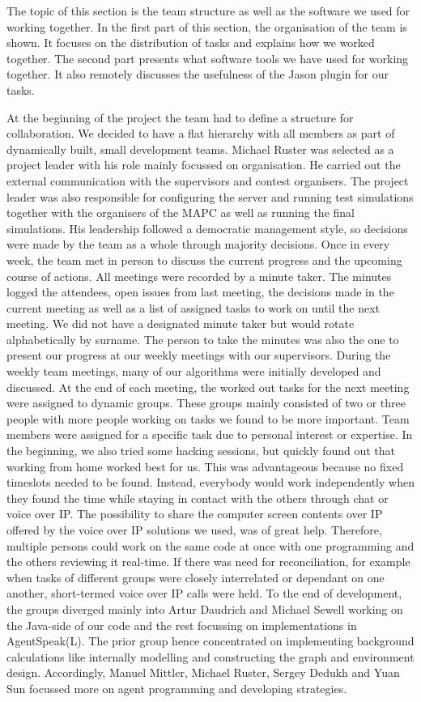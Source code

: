 The topic of this section is the team structure as well as the software we used for working together.
In the first part of this section, the organisation of the team is shown.
It focuses on the distribution of tasks and explains how we worked together.
The second part presents what software tools we have used for working together.
It also remotely discusses the usefulness of the Jason plugin for our tasks.

At the beginning of the project the team had to define a structure for collaboration.
We decided to have a flat hierarchy with all members as part of dynamically built, small development teams.
Michael Ruster was selected as a project leader with his role mainly focussed on organisation.
He carried out the external communication with the supervisors and contest organisers.
The project leader was also responsible for configuring the server and running test simulations together with the organisers of the MAPC as well as running the final simulations.
His leadership followed a democratic management style, so decisions were made by the team as a whole through majority decisions.
Once in every week, the team met in person to discuss the current progress and the upcoming course of actions.
All meetings were recorded by a minute taker.
The minutes logged the attendees, open issues from last meeting, the decisions made in the current meeting as well as a list of assigned tasks to work on until the next meeting.
We did not have a designated minute taker but would rotate alphabetically by surname.
The person to take the minutes was also the one to present our progress at our weekly meetings with our supervisors.
During the weekly team meetings, many of our algorithms were initially developed and discussed.
At the end of each meeting, the worked out tasks for the next meeting were assigned to dynamic groups.
These groups mainly consisted of two or three people with more people working on tasks we found to be more important.
Team members were assigned for a specific task due to personal interest or expertise.
In the beginning, we also tried some hacking sessions, but quickly found out that working from home worked best for us.
This was advantageous because no fixed timeslots needed to be found.
Instead, everybody would work independently when they found the time while staying in contact with the others through chat or voice over IP.
The possibility to share the computer screen contents over IP offered by the voice over IP solutions we used, was of great help.
Therefore, multiple persons could work on the same code at once with one programming and the others reviewing it real-time.
If there was need for reconciliation, for example when tasks of different groups were closely interrelated or dependant on one another, short-termed voice over IP calls were held.
To the end of development, the groups diverged mainly into Artur Daudrich and Michael Sewell working on the Java-side of our code and the rest focussing on implementations in AgentSpeak(L).
The prior group hence concentrated on implementing background calculations like internally modelling and constructing the graph and environment design.
Accordingly, Manuel Mittler, Michael Ruster, Sergey Dedukh and Yuan Sun focussed more on agent programming and developing strategies.

